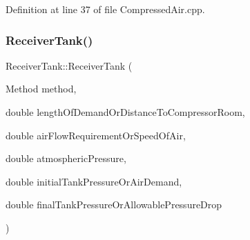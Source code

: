Definition at line 37 of file Compressed\+Air.\+cpp.

\mbox{\label{class_receiver_tank_a499e102ca118bfe3bdff3584310207c2}} 
\subsubsection{\texorpdfstring{Receiver\+Tank()}{ReceiverTank()}\hspace{0.1cm}{\footnotesize\ttfamily [2/3]}}
{\footnotesize\ttfamily Receiver\+Tank\+::\+Receiver\+Tank (\begin{DoxyParamCaption}\item[{Method}]{method,  }\item[{double}]{length\+Of\+Demand\+Or\+Distance\+To\+Compressor\+Room,  }\item[{double}]{air\+Flow\+Requirement\+Or\+Speed\+Of\+Air,  }\item[{double}]{atmospheric\+Pressure,  }\item[{double}]{initial\+Tank\+Pressure\+Or\+Air\+Demand,  }\item[{double}]{final\+Tank\+Pressure\+Or\+Allowable\+Pressure\+Drop }\end{DoxyParamCaption})}

